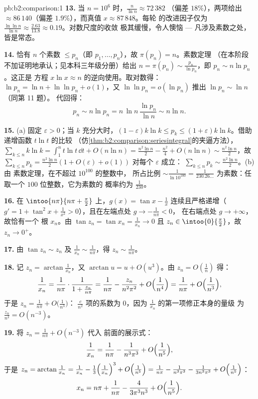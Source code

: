\begin{solution}{pb:b2:comparison:1}
\textbf{13.} 当 $n = 10^6$ 时，$\frac{n}{\ln n} \approx 72\,382$
（偏差 $18\%$），两项给出 $\approx 86\,140$（偏差
$1.9\%$），而真值 $x \approx 87\,848$。每轮
的改进因子仅为 $\frac{\ln\ln n}{\ln n} \approx
\frac{2.63}{13.8} \approx 0.19$。对数尺度的收敛
极其缓慢，令人懊恼 ---
凡涉及素数之处，皆是常态。

\textbf{14.} 恰有 $n$ 个素数 $\leq p_n$（即
$p_1, \dots, p_n$），故 $\pi(p_n) = n$。素数定理
（在本阶段不加证明地承认；见本科三年级分册）给出 $n = \pi(p_n) \sim
\frac{p_n}{\ln p_n}$，即 $p_n \sim n\ln p_n$。这正是
方程 $x\ln x \approx n$ 的逆向使用。取对数得：
$\ln p_n = \ln n + \ln\ln p_n + o(1)$，又 $\ln\ln p_n =
o(\ln p_n)$ 推出 $\ln p_n \sim \ln n$（同第 11 题）。
代回得：
\[
p_n \sim n\ln p_n = n\,\ln n\,\frac{\ln p_n}{\ln n} \sim n\ln
n .
\]

\textbf{15.} (a) 固定 $\varepsilon > 0$；当 $k$ 充分大时，$(1 -
\varepsilon)k\ln k \leq p_k \leq (1 + \varepsilon)k\ln k$。借助
递增函数 $t\ln t$ 的比较
（仿\cref{thm:b2:comparison:seriesintegral}的夹逼方法），
$\sum_{k\leq n}k\ln k = \int_1^n t\ln t\,\dd t + O(n\ln n) =
\frac{n^2\ln n}2 - \frac{n^2}4 + O(n\ln n) \sim
\frac{n^2\ln n}2$，故 $\sum_{k\leq n}p_k = \frac{n^2\ln
n}{2}(1 + O(\varepsilon) + o(1))$ 对每个 $\varepsilon$ 成立：
$\sum_{k\leq n}p_k \sim \frac{n^2\ln n}2$。(b) 由
素数定理，在不超过 $10^{100}$ 的整数中，
所占比例 $\sim \frac{1}{\ln 10^{100}} = \frac1{230.26\dots}$
为素数：任取一个 $100$ 位整数，它为素数的
概率约为 $\frac1{230}$。

\textbf{16.} 在 $\intoo{n\pi}{n\pi + \frac\pi2}$ 上，$g(x) = \tan
x - \frac1x$ 连续且严格递增（$g' = 1 +
\tan^2x + \frac1{x^2} > 0$），且在左端点处 $g \to -\frac1{n\pi} < 0$，
在右端点处 $g \to +\infty$，故恰有一个
根 $x_n$。由 $\tan z_n = \tan x_n = \frac1{x_n} \to 0$
且 $z_n \in \intoo{0}{\frac\pi2}$，故 $z_n \to 0^+$。

\textbf{17.} 由 $\tan z_n \sim z_n$ 及 $\frac1{x_n} \sim
\frac1{n\pi}$，得 $z_n \sim \frac1{n\pi}$。

\textbf{18.} 记 $z_n = \arctan\frac1{x_n}$，又 $\arctan u = u +
O(u^3)$。由 $z_n = O(\frac1n)$ 得：
\[
\frac1{x_n} = \frac{1}{n\pi}\cdot\frac1{1 + \frac{z_n}{n\pi}}
= \frac1{n\pi} - \frac{z_n}{n^2\pi^2} +
O\Bigl(\frac1{n^4}\Bigr)
= \frac1{n\pi} + O\Bigl(\frac1{n^3}\Bigr),
\]
于是 $z_n = \frac1{n\pi} + O\bigl(\frac1{n^3}\bigr)$：
$\frac{c}{n^2}$ 项的系数为 $0$，因为
$\frac1{x_n}$ 的第一项修正本身的量级
为 $\frac{z_n}{n^2} = O(n^{-3})$。

\textbf{19.} 将 $z_n = \frac1{n\pi} + O(n^{-3})$ 代入
前面的展示式：
\[
\frac{1}{x_n} = \frac{1}{n\pi} - \frac{1}{n^3\pi^3} +
O\Bigl(\frac1{n^5}\Bigr),
\]
于是 $z_n = \arctan\frac1{x_n} = \frac1{x_n} -
\frac{1}{3}\Bigl(\frac1{x_n}\Bigr)^3 + O\Bigl(\frac1{n^5}\Bigr)
= \frac1{n\pi} - \frac{1}{n^3\pi^3} - \frac{1}{3n^3\pi^3} +
O\Bigl(\frac1{n^5}\Bigr)$：
\[
x_n = n\pi + \frac{1}{n\pi} - \frac{4}{3\pi^3n^3} +
O\Bigl(\frac1{n^5}\Bigr).
\]


\end{solution}
